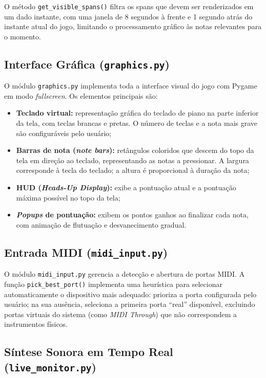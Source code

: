 \documentclass[
  12pt,
  openright,
  twoside,
  a4paper,
  english,
  brazil
]{abntex2}
\begin{document}
O método \texttt{get\_visible\_spans()} filtra os spans que devem ser
renderizados em um dado instante, com uma janela de 8 segundos à frente
e 1 segundo atrás do instante atual do jogo, limitando o processamento
gráfico às notas relevantes para o momento.

\subsection{Interface Gráfica (\texttt{graphics.py})}

O módulo \texttt{graphics.py} implementa toda a interface visual do
jogo com Pygame em modo \textit{fullscreen}. Os elementos principais são:

\begin{itemize}
  \item \textbf{Teclado virtual:} representação gráfica do teclado de
        piano na parte inferior da tela, com teclas brancas e pretas.
        O número de teclas e a nota mais grave são configuráveis pelo
        usuário;
  \item \textbf{Barras de nota (\textit{note bars}):} retângulos
        coloridos que descem do topo da tela em direção ao teclado,
        representando as notas a pressionar. A largura corresponde à
        tecla do teclado; a altura é proporcional à duração da nota;
  \item \textbf{HUD (\textit{Heads-Up Display}):} exibe a pontuação
        atual e a pontuação máxima possível no topo da tela;
  \item \textbf{\textit{Popups} de pontuação:} exibem os pontos
        ganhos ao finalizar cada nota, com animação de flutuação e
        desvanecimento gradual.
\end{itemize}

\subsection{Entrada MIDI (\texttt{midi\_input.py})}

O módulo \texttt{midi\_input.py} gerencia a detecção e abertura de
portas MIDI. A função \texttt{pick\_best\_port()} implementa uma
heurística para selecionar automaticamente o dispositivo mais adequado:
prioriza a porta configurada pelo usuário; na sua ausência, seleciona
a primeira porta ``real'' disponível, excluindo portas virtuais do
sistema (como \textit{MIDI Through}) que não correspondem a instrumentos
físicos.

\subsection{Síntese Sonora em Tempo Real (\texttt{live\_monitor.py})}
\end{document}
